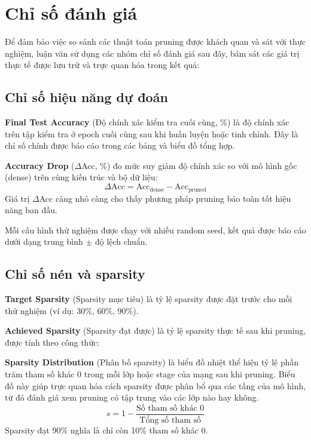     \section{Chỉ số đánh giá}
    \label{sec:metrics}
 
    Để đảm bảo việc so sánh các thuật toán pruning được khách quan và sát với thực nghiệm, luận văn sử dụng các nhóm chỉ số đánh giá sau đây, bám sát các giá trị thực tế được lưu trữ và trực quan hóa trong kết quả:

    \subsection{Chỉ số hiệu năng dự đoán}
    \label{subsec:accuracy}
    	\textbf{Final Test Accuracy} (Độ chính xác kiểm tra cuối cùng, \%) là độ chính xác trên tập kiểm tra ở epoch cuối cùng sau khi huấn luyện hoặc tinh chỉnh. Đây là chỉ số chính được báo cáo trong các bảng và biểu đồ tổng hợp.

    	\textbf{Accuracy Drop} ($\Delta$Acc, \%) đo mức suy giảm độ chính xác so với mô hình gốc (dense) trên cùng kiến trúc và bộ dữ liệu:
    \begin{equation}
        \Delta\text{Acc} = \text{Acc}_{\text{dense}} - \text{Acc}_{\text{pruned}}
    \end{equation}
    Giá trị $\Delta$Acc càng nhỏ càng cho thấy phương pháp pruning bảo toàn tốt hiệu năng ban đầu.

    Mỗi cấu hình thử nghiệm được chạy với nhiều random seed, kết quả được báo cáo dưới dạng trung bình $\pm$ độ lệch chuẩn.

    \subsection{Chỉ số nén và sparsity}
    \label{subsec:compression_metrics}

    	\textbf{Target Sparsity} (Sparsity mục tiêu) là tỷ lệ sparsity được đặt trước cho mỗi thử nghiệm (ví dụ: 30\%, 60\%, 90\%).

    	\textbf{Achieved Sparsity} (Sparsity đạt được) là tỷ lệ sparsity thực tế sau khi pruning, được tính theo công thức:

        \textbf{Sparsity Distribution} (Phân bố sparsity) là biểu đồ nhiệt thể hiện tỷ lệ phần trăm tham số khác 0 trong mỗi lớp hoặc stage của mạng sau khi pruning. Biểu đồ này giúp trực quan hóa cách sparsity được phân bổ qua các tầng của mô hình, từ đó đánh giá xem pruning có tập trung vào các lớp nào hay không.
    \begin{equation}
        s = 1 - \frac{\text{Số tham số khác 0}}{\text{Tổng số tham số}}
    \end{equation}
    Sparsity đạt 90\% nghĩa là chỉ còn 10\% tham số khác 0.

